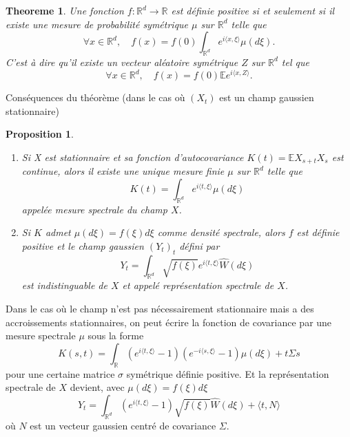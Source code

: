 \documentclass[11pt]{article} %
\newtheorem{theoreme}{Theoreme}[section]
\newtheorem{proposition}{Proposition}[section]
\begin{document}
\begin{theoreme}
	Une fonction $f:\mathbb{R}^d\to \mathbb{R}$ est définie positive si et seulement si il existe une mesure de probabilité symétrique $\mu$ sur $\mathbb{R}^d$ telle que 
	\begin{equation}
		\forall x \in \mathbb{R}^d,\quad f(x) = f(0)\int_{\mathbb{R}^d} e^{i\langle x, \xi \rangle} \mu(d\xi).
	\end{equation}
	C'est à dire qu'il existe un vecteur aléatoire symétrique $Z$ sur $\mathbb{R}^d$ tel que 
	\begin{equation}
				\forall x \in \mathbb{R}^d,\quad f(x) = f(0) \mathbb{E} e^{i\langle x, Z \rangle}.
	\end{equation}
\end{theoreme}
Conséquences du théorème (dans le cas où $(X_t)$ est un champ gaussien stationnaire)
\begin{proposition}
	\begin{enumerate}
		\item Si X est stationnaire et sa fonction d'autocovariance $K(t) = \mathbb{E}X_{s+t}X_s$ est continue, alors il existe une unique mesure finie $\mu$ sur $\mathbb{R}^d$ telle que 
			\begin{equation}
				K(t) = \int_{\mathbb{R}^d} e^{i\langle t, \xi\rangle}\mu(d\xi)
			\end{equation}
			appelée mesure spectrale du champ $X$.
		\item Si $K$ admet $\mu(d\xi) = f(\xi)d\xi$ comme densité spectrale, alors $f$ est définie positive et le champ gaussien $(Y_t)_t$ défini par
			\begin{equation}
				Y_t = \int_{\mathbb{R}^d} \sqrt{f(\xi)} e^{i\langle t, \xi\rangle} \hat{W}(d\xi)
			\end{equation}
			est indistinguable de $X$ et appelé représentation spectrale de $X$.
	\end{enumerate}
\end{proposition}
Dans le cas où le champ n'est pas nécessairement stationnaire mais a des accroissements stationnaires, on peut écrire la fonction de covariance par une mesure spectrale $\mu$ sous la forme
	\begin{equation}
		K(s,t) = \int_{\mathbb{R}} \left(e^{i\langle t,\xi\rangle} -1\right)\left(e^{-i\langle s, \xi\rangle} - 1\right)\mu(d\xi) + t\Sigma s
	\end{equation}
pour une certaine matrice $\sigma$ symétrique définie positive.
\newline
Et la représentation spectrale de $X$ devient, avec $\mu(d\xi) = f(\xi)d\xi$
\begin{equation}
	Y_t = \int_{\mathbb{R}^d} \left(e^{i\langle t, \xi \rangle} - 1\right) \sqrt{f(\xi)} \hat{W}(d\xi) + \langle t, N\rangle
\end{equation}
où $N$ est un vecteur gaussien centré de covariance $\Sigma$.
\end{document}

